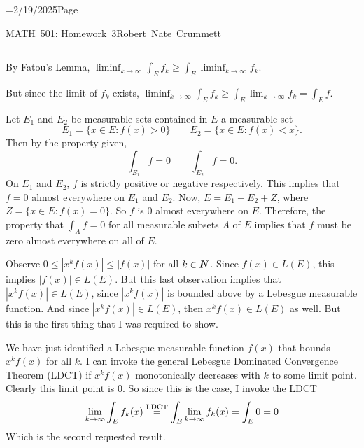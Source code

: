 \footline={2/19/2025\hfill Page \folio}
\def\reals{I\kern-4pt R}
\def\nats{I\kern-4pt N}
\let\oldexists\exists \def\exists{\oldexists \;}
\let\oldforall\forall \def\forall{\oldforall \,}
\def\qed{\vrule height 6pt width 6pt depth 0pt}
\parindent 0pt
\parskip 2mm


MATH~501: Homework~3\hfill Robert~Nate~Crummett
\smallskip
\hrule




By Fatou's Lemma, $\liminf_{k\to\infty}\int_Ef_k\geq\int_E\liminf_{k\to\infty}f_k$.

But since the limit of $f_k$ exists, $\liminf_{k\to\infty}\int_Ef_k\geq\int_E\lim_{k\to\infty}f_k=\int_Ef$.




Let $E_1$ and $E_2$ be measurable sets contained in $E$ a measurable set
$$E_1=\{x\in E:f(x)>0\}\qquad E_2=\{x\in E:f(x)<x\}.$$
Then by the property given,
$$\int_{E_1}f=0\qquad\int_{E_2}f=0.$$
On $E_1$ and $E_2$, $f$ is strictly positive or negative respectively.
This implies that $f=0$ almost everywhere on $E_1$ and $E_2$.
Now, $E = E_1 + E_2 + Z$, where $Z=\{x\in E:f(x)=0\}$.
So $f$ is 0 almost everywhere on $E$.
Therefore, the property that $\int_Af=0$ for all measurable subsets $A$ of $E$ implies that $f$ must be zero almost everywhere on all of $E$.




Observe $0\leq|x^kf(x)|\leq|f(x)|$ for all $k\in\nats$.
Since $f(x)\in L(E)$, this implies $|f(x)|\in L(E)$.
But this last observation implies that $|x^kf(x)|\in L(E)$, since $|x^kf(x)|$ is bounded above by a Lebesgue measurable function.
And since $|x^kf(x)|\in L(E)$, then $x^kf(x)\in L(E)$ as well.
But this is the first thing that I was required to show.

We have just identified a Lebesgue measurable function $f(x)$ that bounds $x^kf(x)$ for all $k$.
I can invoke the general Lebesgue Dominated Convergence Theorem (LDCT) if $x^kf(x)$ monotonically decreases with $k$ to some limit point.
Clearly this limit point is $0$.
So since this is the case, I invoke the LDCT
$$\lim_{k\to\infty}\int_Ef_k(x)\buildrel\rm LDCT\over =\int_E\lim_{k\to\infty}f_k(x)=\int_E0=0$$
Which is the second requested result.





\bye

